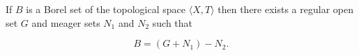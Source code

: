 If $B$ is a Borel set of the topological space $\langle X, T \rangle$ then there exists a regular open set $G$ and meager sets $N_1$ and $N_2$ such that

$$B = (G + N_1) - N_2.$$
